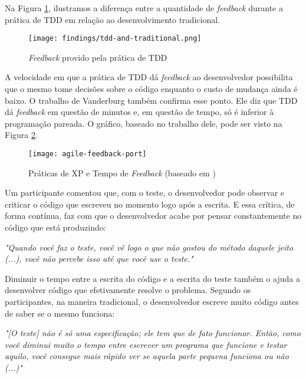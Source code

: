 Na Figura \ref{fig:tdd-feedback}, ilustramos
a diferença entre a quantidade de \textit{feedback} durante a prática de TDD em relação
ao desenvolvimento tradicional.

\begin{figure}[h!H]
  \centering
  \texttt{[image: findings/tdd-and-traditional.png]}
  \caption{\textit{Feedback} provido pela prática de TDD}
  \label{fig:tdd-feedback}
\end{figure}

A velocidade em que a prática de TDD dá \textit{feedback} ao desenvolvedor possibilita que o mesmo
tome decisões sobre o código enquanto o custo de mudança ainda é
baixo. O trabalho de Vanderburg \cite{vanderburg} também confirma esse ponto.
Ele diz que TDD dá \textit{feedback} em questão de
minutos e, em questão de tempo, só é inferior à programação pareada. O gráfico,
baseado no trabalho dele, pode ser visto na Figura
\ref{fig:agile-feedback}.

\begin{figure}[h!H]
  \centering
  \texttt{[image: agile-feedback-port]}
  \caption{Práticas de XP e Tempo de \textit{Feedback} (baseado em \cite{vanderburg})}
  \label{fig:agile-feedback}
\end{figure}

Um participante comentou que, com o teste, o desenvolvedor pode observar
e criticar o código que escreveu no momento logo após a escrita.
E essa crítica, de forma contínua, faz com que o desenvolvedor acabe
por pensar constantemente no código que está produzindo:

\begin{framed}
\textit{"Quando você faz o teste, você vê logo o que não gostou do método daquele jeito (...), você
não percebe isso até que você use o teste."}
\end{framed}

Diminuir o tempo entre a escrita do código e a escrita do teste também o ajuda a desenvolver código
que efetivamente resolve o problema. Segundo os participantes, na maneira tradicional, 
o desenvolvedor escreve muito código antes de saber se o mesmo funciona:

\begin{framed}
\textit{"[O teste] não é só uma especificação; ele tem que de fato funcionar. Então,
como você diminui muito o tempo entre escrever um programa que funcione e testar aquilo,
você consegue mais rápido ver se aquela parte pequena funciona ou não (...)"}
\end{framed}

